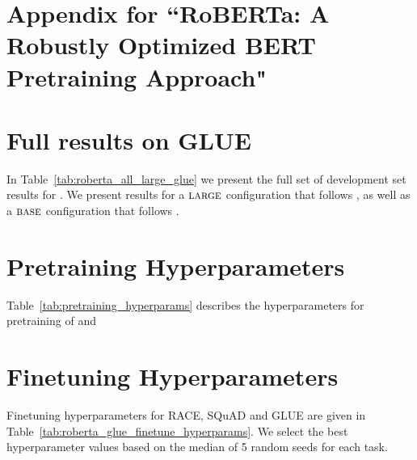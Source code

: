 \appendix





\section*{Appendix for ``RoBERTa: A Robustly Optimized BERT Pretraining Approach"}

\section{Full results on GLUE}

In Table~\ref{tab:roberta_all_large_glue} we present the full set of development set results for \ourmodel{}.
We present results for a $\textsc{large}$ configuration that follows \bertlarge{}, as well as a $\textsc{base}$ configuration that follows \bertbase{}.

\section{Pretraining Hyperparameters}
Table~\ref{tab:pretraining_hyperparams} describes the hyperparameters for pretraining of \ourmodellarge{} and \ourmodelbase{} 

\section{Finetuning Hyperparameters}
\label{app:hyperparams}

Finetuning hyperparameters for RACE, SQuAD and GLUE are given in  Table~\ref{tab:roberta_glue_finetune_hyperparams}.
We select the best hyperparameter values based on the median of 5 random seeds for each task.




